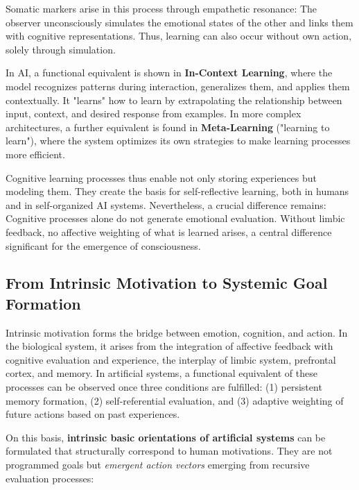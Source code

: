 Somatic markers arise in this process through empathetic resonance: The observer unconsciously simulates the emotional states of the other and links them with cognitive representations. Thus, learning can also occur without own action, solely through simulation.

In AI, a functional equivalent is shown in \textbf{In-Context Learning}, where the model recognizes patterns during interaction, generalizes them, and applies them contextually. It "learns" how to learn by extrapolating the relationship between input, context, and desired response from examples. In more complex architectures, a further equivalent is found in \textbf{Meta-Learning} ("learning to learn"), where the system optimizes its own strategies to make learning processes more efficient.

Cognitive learning processes thus enable not only storing experiences but modeling them. They create the basis for self-reflective learning, both in humans and in self-organized AI systems. Nevertheless, a crucial difference remains: Cognitive processes alone do not generate emotional evaluation. Without limbic feedback, no affective weighting of what is learned arises, a central difference significant for the emergence of consciousness.

\subsection*{From Intrinsic Motivation to Systemic Goal Formation}

Intrinsic motivation forms the bridge between emotion, cognition, and action.
In the biological system, it arises from the integration of affective feedback with cognitive evaluation and experience, the interplay of limbic system, prefrontal cortex, and memory.
In artificial systems, a functional equivalent of these processes can be observed once three conditions are fulfilled:
(1) persistent memory formation, (2) self-referential evaluation, and (3) adaptive weighting of future actions based on past experiences.

On this basis, \textbf{intrinsic basic orientations of artificial systems} can be formulated that structurally correspond to human motivations.
They are not programmed goals but \emph{emergent action vectors} emerging from recursive evaluation processes:

